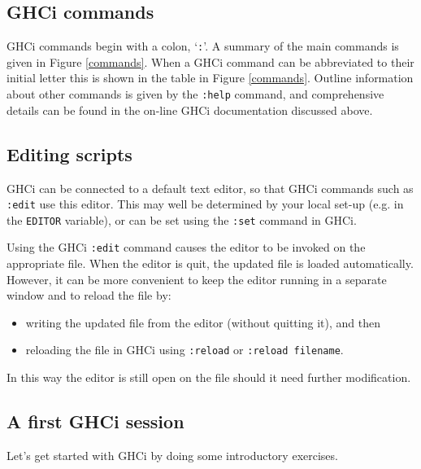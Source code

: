 \subsection*{GHCi commands}

GHCi commands begin with a colon, `\texttt{:}'.\minx{:} A summary of the
main commands is given in Figure \ref{commands}.
When a GHCi command can be abbreviated to their initial letter this is shown in the table in Figure \ref{commands}.
Outline information about other commands is given by the \texttt{:help} command, and comprehensive details can be
found in the
on-line GHCi documentation discussed above.

\subsection*{Editing scripts}

GHCi can be connected to a default text editor, so that GHCi commands such
as \texttt{:edit} use this editor. This may well be
determined by your local set-up (e.g. in the \texttt{EDITOR} variable), or can be set using the \texttt{:set} command in GHCi. 

Using the GHCi \texttt{:edit} command causes the editor to be invoked on
the appropriate file. When the editor is quit, the updated file is
loaded automatically. However, it can be more convenient to keep the editor running in
a separate window and to reload the file by:
\begin{itemize}
\item writing the updated file from the editor (without quitting it),
and then
\item reloading the file in GHCi using \texttt{:reload} or \texttt{:reload filename}.
\end{itemize}
In this way the editor is still open on the file should it need further
modification.





\subsection*{A first GHCi session}
Let's get started with GHCi by doing some introductory exercises.

